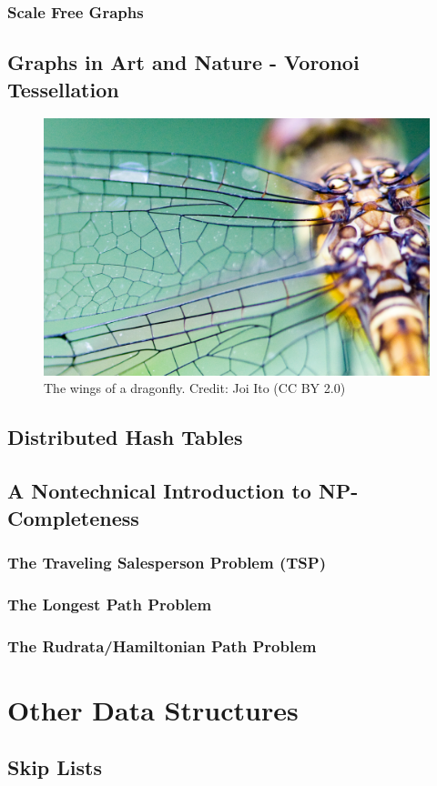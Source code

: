 \documentclass[10pt,a4paper]{book}
\begin{document}
\subsection{Scale Free Graphs}


\section{Graphs in Art and Nature - Voronoi Tessellation}

\begin{figure}
	\centering
	\includegraphics[width=0.7\linewidth]{pics/dragonfly_wing_joi_ito}
	\caption{The wings of a dragonfly. Credit: Joi Ito (CC BY 2.0)}
	\label{fig:dragonflywingjoiito}
\end{figure}


\section{Distributed Hash Tables}





\section{A Nontechnical Introduction to NP-Completeness}

\subsection{The Traveling Salesperson Problem (TSP)}
\subsection{The Longest Path Problem}
\subsection{The Rudrata/Hamiltonian Path Problem}
\chapter{Other Data Structures}
\section{Skip Lists}
\end{document}
